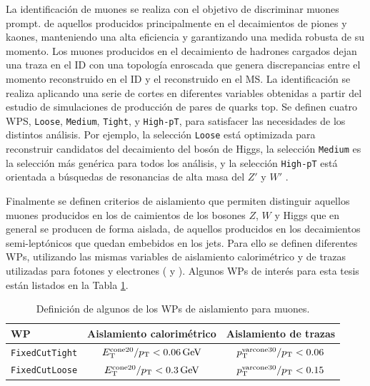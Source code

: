 La identificación de muones se realiza con el objetivo de discriminar muones prompt. de aquellos producidos principalmente en el decaimientos de piones y kaones, manteniendo una alta eficiencia y garantizando una medida robusta de su momento. Los muones producidos en el decaimiento de hadrones cargados dejan una traza en el ID con una topología enroscada 
que genera discrepancias entre el momento reconstruido en el ID y el reconstruido en el MS. La identificación se realiza aplicando una serie de cortes en diferentes variables \cite{PERF-2015-10} obtenidas a partir del estudio de simulaciones de producción de pares de quarks top. Se definen cuatro WPS, \texttt{Loose}, \texttt{Medium}, \texttt{Tight}, y \texttt{High-pT}, para satisfacer las necesidades de los distintos análisis. Por ejemplo, la selección \texttt{Loose} está optimizada para reconstruir candidatos del decaimiento del bosón de Higgs, la selección \texttt{Medium} es la selección más genérica para todos los análisis, y la selección \texttt{High-pT} está orientada a búsquedas de resonancias de alta masa del $Z'$ y $W'$ \cite{EXOT-2016-18,EXOT-2016-06,EXOT-2016-05,EXOT-2015-04}. 

Finalmente se definen criterios de aislamiento que permiten distinguir aquellos muones producidos en los de caimientos de los bosones $Z$, $W$ y Higgs que en general se producen de forma aislada, de aquellos producidos en los decaimientos semi-leptónicos que quedan embebidos en los jets. Para ello se definen diferentes
WPs, utilizando las mismas variables de aislamiento calorimétrico y de trazas utilizadas para fotones y electrones ( y ). Algunos WPs de interés para esta tesis están listados en la {Tabla \ref{tab:muon_WPs}}.

\begin{table} 
\centering
\caption{Definición de algunos de los WPs de aislamiento para muones. 
}
  \begin{tabular}{ l c c}

  \hline
  \hline

    WP & Aislamiento calorimétrico & Aislamiento de trazas \\

    \hline
    \hline

    \texttt{FixedCutTight} & $E_{\text{T}}^{\text{cone20}}/p_{\text{T}} < 0.06\,\text{GeV}$ & $p_{\text{T}}^{\text{varcone30}}/p_{\text{T}}<0.06$ \\

    \texttt{FixedCutLoose} & $E_{\text{T}}^{\text{cone20}}/p_{\text{T}} < 0.3\,\text{GeV}$  & $p_{\text{T}}^{\text{varcone30}}/p_{\text{T}}<0.15$ \\



    \hline
    \hline

  \end{tabular}
\label{tab:muon_WPs}
\end{table}

